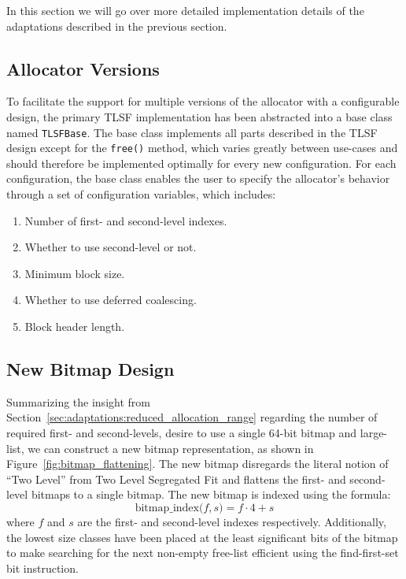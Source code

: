 
In this section we will go over more detailed implementation details of the adaptations described in the previous section.

\subsection{Allocator Versions}

To facilitate the support for multiple versions of the allocator with a configurable design, the primary TLSF implementation has been abstracted into a base class named \texttt{TLSFBase}. The base class implements all parts described in the TLSF design except for the \texttt{free()} method, which varies greatly between use-cases and should therefore be implemented optimally for every new configuration. For each configuration, the base class enables the user to specify the allocator's behavior through a set of configuration variables, which includes:

\begin{enumerate}
  \item Number of first- and second-level indexes.
  \item Whether to use second-level or not.
  \item Minimum block size.
  \item Whether to use deferred coalescing.
  \item Block header length.
\end{enumerate}

\subsection{New Bitmap Design}

Summarizing the insight from Section~\ref{sec:adaptations:reduced_allocation_range} regarding the number of required first- and second-levels, desire to use a single 64-bit bitmap and large-list, we can construct a new bitmap representation, as shown in Figure~\ref{fig:bitmap_flattening}. The new bitmap disregards the literal notion of ``Two Level'' from Two Level Segregated Fit and flattens the first- and second-level bitmaps to a single bitmap. The new bitmap is indexed using the formula: 
\[
    \text{bitmap\_index($f, s$)} = f \cdot 4 + s
\]
where $f$ and $s$ are the first- and second-level indexes respectively. Additionally, the lowest size classes have been placed at the least significant bits of the bitmap to make searching for the next non-empty free-list efficient using the find-first-set bit instruction.

